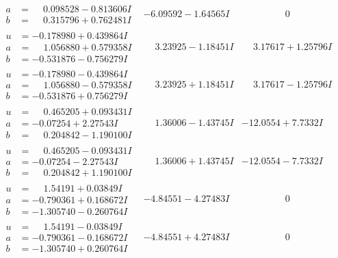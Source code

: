 \documentclass[1p]{elsarticle_modified}
\theoremstyle{definition}
\begin{document}
$$\begin{array}{c|c|c}
\begin{aligned}
a &= \phantom{-}0.098528 - 0.813606 I \\
b &= \phantom{-}0.315796 + 0.762481 I\end{aligned}
 & -6.09592 - 1.64565 I & \phantom{-0.000000 } 0 \\ \hline\begin{aligned}
u &= -0.178980 + 0.439864 I \\
a &= \phantom{-}1.056880 + 0.579358 I \\
b &= -0.531876 - 0.756279 I\end{aligned}
 & \phantom{-}3.23925 - 1.18451 I & \phantom{-}3.17617 + 1.25796 I \\ \hline\begin{aligned}
u &= -0.178980 - 0.439864 I \\
a &= \phantom{-}1.056880 - 0.579358 I \\
b &= -0.531876 + 0.756279 I\end{aligned}
 & \phantom{-}3.23925 + 1.18451 I & \phantom{-}3.17617 - 1.25796 I \\ \hline\begin{aligned}
u &= \phantom{-}0.465205 + 0.093431 I \\
a &= -0.07254 + 2.27543 I \\
b &= \phantom{-}0.204842 - 1.190100 I\end{aligned}
 & \phantom{-}1.36006 - 1.43745 I & -12.0554 + 7.7332 I \\ \hline\begin{aligned}
u &= \phantom{-}0.465205 - 0.093431 I \\
a &= -0.07254 - 2.27543 I \\
b &= \phantom{-}0.204842 + 1.190100 I\end{aligned}
 & \phantom{-}1.36006 + 1.43745 I & -12.0554 - 7.7332 I \\ \hline\begin{aligned}
u &= \phantom{-}1.54191 + 0.03849 I \\
a &= -0.790361 + 0.168672 I \\
b &= -1.305740 - 0.260764 I\end{aligned}
 & -4.84551 - 4.27483 I & \phantom{-0.000000 } 0 \\ \hline\begin{aligned}
u &= \phantom{-}1.54191 - 0.03849 I \\
a &= -0.790361 - 0.168672 I \\
b &= -1.305740 + 0.260764 I\end{aligned}
 & -4.84551 + 4.27483 I & \phantom{-0.000000 } 0 \\ \hline\begin{aligned}

\end{aligned}
\end{array}$$
\end{document}
